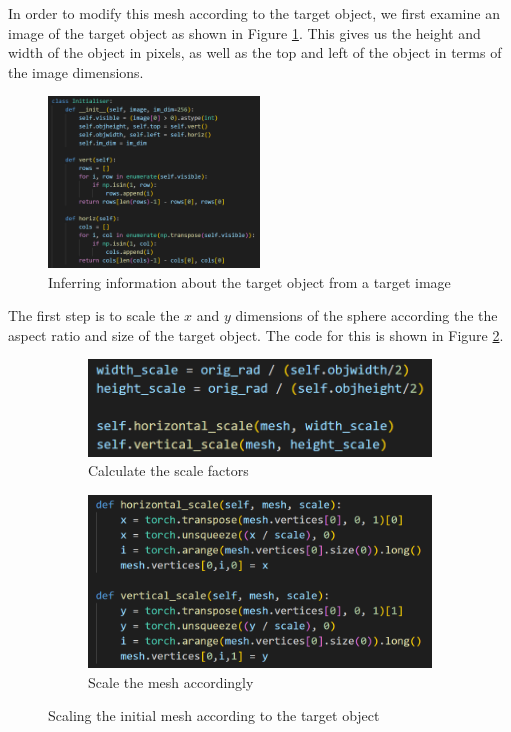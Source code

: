 \documentclass{article}
\begin{document}
In order to modify this mesh according to the target object, we first examine an image of the target object as shown in Figure \ref{imageeval}. This gives us the height and width of the object in pixels, as well as the top and left of the object in terms of the image dimensions.

\begin{figure}[h!]
  \centering
  \includegraphics[width=0.5\textwidth]{images/image_eval.png}
  \caption{Inferring information about the target object from a target image}
  \label{imageeval}
\end{figure}

The first step is to scale the $x$ and $y$ dimensions of the sphere according the the aspect ratio and size of the target object. The code for this is shown in Figure \ref{scalecode}.

\begin{figure}[h!]
  \centering
  \begin{subfigure}{0.4\textwidth}
    \centering
    \includegraphics[width=\textwidth]{images/scale_a.png}
    \caption{Calculate the scale factors}
  \end{subfigure}
  \hfill
  \begin{subfigure}{0.4\textwidth}
    \centering
    \includegraphics[width=\textwidth]{images/scale_b.png}
    \caption{Scale the mesh accordingly}
  \end{subfigure}
  \caption{Scaling the initial mesh according to the target object}
  \label{scalecode}
\end{figure}
\end{document}

